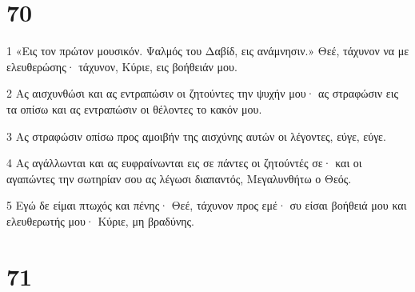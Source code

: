 \chapter{70}

\par 1 «Εις τον πρώτον μουσικόν. Ψαλμός του Δαβίδ, εις ανάμνησιν.» Θεέ, τάχυνον να με ελευθερώσης· τάχυνον, Κύριε, εις βοήθειάν μου.
\par 2 Ας αισχυνθώσι και ας εντραπώσιν οι ζητούντες την ψυχήν μου· ας στραφώσιν εις τα οπίσω και ας εντραπώσιν οι θέλοντες το κακόν μου.
\par 3 Ας στραφώσιν οπίσω προς αμοιβήν της αισχύνης αυτών οι λέγοντες, εύγε, εύγε.
\par 4 Ας αγάλλωνται και ας ευφραίνωνται εις σε πάντες οι ζητούντές σε· και οι αγαπώντες την σωτηρίαν σου ας λέγωσι διαπαντός, Μεγαλυνθήτω ο Θεός.
\par 5 Εγώ δε είμαι πτωχός και πένης· Θεέ, τάχυνον προς εμέ· συ είσαι βοήθειά μου και ελευθερωτής μου· Κύριε, μη βραδύνης.

\chapter{71}

